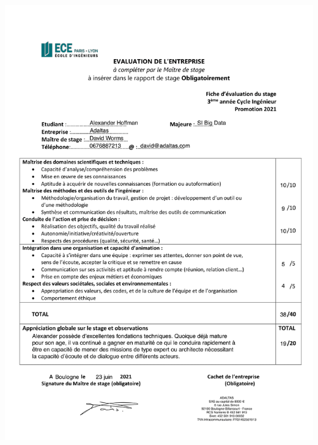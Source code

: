 \documentclass[12pt, french]{report}
\begin{document}
\clearpage

\printglossaries



\includegraphics[scale=0.25]{assets/img/evaluation.png}


\end{document}
